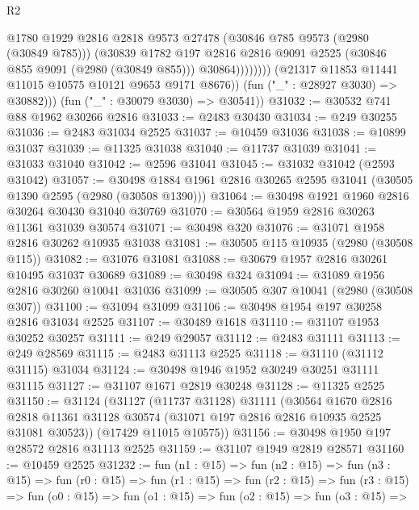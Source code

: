 \begin{lexlean}{R2}
\begin{coremodule}
                          @1780
                          @1929
                          @2816
                          @2818
                          @9573
                          @27478
                          (@30846 @785 @9573 (@2980 (@30849 @785)))
                          (@30839
                            @1782
                            @197
                            @2816
                            @2816
                            @9091
                            @2525
                            (@30846 @855 @9091 (@2980 (@30849 @855)))
                            @30864))))))))
            (@21317 @11853 @11441 @11015 @10575 @10121 @9653 @9171 @8676))
          (fun ("_" : @28927 @3030) => @30882)))
      (fun ("_" : @30079 @3030) => @30541))
@31032 := @30532 @741 @88 @1962 @30266 @2816
@31033 := @2483 @30430
@31034 := @249 @30255
@31036 := @2483 @31034 @2525
@31037 := @10459 @31036
@31038 := @10899 @31037
@31039 := @11325 @31038
@31040 := @11737 @31039
@31041 := @31033 @31040
@31042 := @2596 @31041
@31045 := @31032 @31042 (@2593 @31042)
@31057 := @30498 @1884 @1961 @2816 @30265 @2595 @31041 (@30505 @1390 @2595 (@2980 (@30508 @1390)))
@31064 := @30498 @1921 @1960 @2816 @30264 @30430 @31040 @30769
@31070 := @30564 @1959 @2816 @30263 @11361 @31039 @30574
@31071 := @30498 @320
@31076 := @31071 @1958 @2816 @30262 @10935 @31038
@31081 := @30505 @115 @10935 (@2980 (@30508 @115))
@31082 := @31076 @31081
@31088 := @30679 @1957 @2816 @30261 @10495 @31037 @30689
@31089 := @30498 @324
@31094 := @31089 @1956 @2816 @30260 @10041 @31036
@31099 := @30505 @307 @10041 (@2980 (@30508 @307))
@31100 := @31094 @31099
@31106 := @30498 @1954 @197 @30258 @2816 @31034 @2525
@31107 := @30489 @1618
@31110 := @31107 @1953 @30252 @30257
@31111 := @249 @29057
@31112 := @2483 @31111
@31113 := @249 @28569
@31115 := @2483 @31113 @2525
@31118 := @31110 (@31112 @31115) @31034
@31124 := @30498 @1946 @1952 @30249 @30251 @31111 @31115
@31127 := @31107 @1671 @2819 @30248
@31128 := @11325 @2525
@31150 := @31124
    (@31127
      (@11737 @31128)
      @31111
      (@30564
        @1670
        @2816
        @2818
        @11361
        @31128
        @30574
        (@31071 @197 @2816 @2816 @10935 @2525 @31081 @30523))
      (@17429 @11015 @10575))
@31156 := @30498 @1950 @197 @28572 @2816 @31113 @2525
@31159 := @31107 @1949 @2819 @28571
@31160 := @10459 @2525
@31232 := fun (n1 : @15) =>
  fun (n2 : @15) =>
  fun (n3 : @15) =>
  fun (r0 : @15) =>
  fun (r1 : @15) =>
  fun (r2 : @15) =>
  fun (r3 : @15) =>
  fun (o0 : @15) =>
  fun (o1 : @15) =>
  fun (o2 : @15) =>
  fun (o3 : @15) =>

\end{coremodule}
\end{lexlean}
